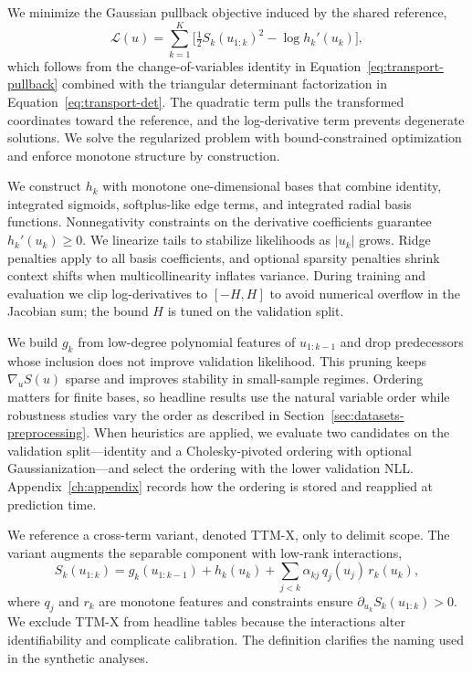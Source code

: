 \documentclass[11pt,a4paper,twoside]{book}\usepackage[]{graphicx}\usepackage[]{xcolor}
\begin{document}
We minimize the Gaussian pullback objective induced by the shared reference,
\begin{equation}
  \mathcal{L}(u) = \sum_{k=1}^K \Big[ \tfrac{1}{2} S_k(u_{1:k})^2 - \log h_k'(u_k) \Big],
  \label{eq:ttm-separable-loss}
\end{equation}
which follows from the change-of-variables identity in Equation~\eqref{eq:transport-pullback} combined with the triangular determinant factorization in Equation~\eqref{eq:transport-det}. The quadratic term pulls the transformed coordinates toward the reference, and the log-derivative term prevents degenerate solutions. We solve the regularized problem with bound-constrained optimization and enforce monotone structure by construction.

We construct $h_k$ with monotone one-dimensional bases that combine identity, integrated sigmoids, softplus-like edge terms, and integrated radial basis functions. Nonnegativity constraints on the derivative coefficients guarantee $h_k'(u_k) \ge 0$. We linearize tails to stabilize likelihoods as $|u_k|$ grows. Ridge penalties apply to all basis coefficients, and optional sparsity penalties shrink context shifts when multicollinearity inflates variance. During training and evaluation we clip log-derivatives to $[-H, H]$ to avoid numerical overflow in the Jacobian sum; the bound $H$ is tuned on the validation split.

We build $g_k$ from low-degree polynomial features of $u_{1:k-1}$ and drop predecessors whose inclusion does not improve validation likelihood. This pruning keeps $\nabla_u S(u)$ sparse and improves stability in small-sample regimes. Ordering matters for finite bases, so headline results use the natural variable order while robustness studies vary the order as described in Section~\ref{sec:datasets-preprocessing}. When heuristics are applied, we evaluate two candidates on the validation split—identity and a Cholesky-pivoted ordering with optional Gaussianization—and select the ordering with the lower validation NLL. Appendix~\ref{ch:appendix} records how the ordering is stored and reapplied at prediction time.

We reference a cross-term variant, denoted TTM-X, only to delimit scope. The variant augments the separable component with low-rank interactions,
\begin{equation}
  S_k(u_{1:k}) = g_k(u_{1:k-1}) + h_k(u_k) + \sum_{j<k} \alpha_{kj}\,q_j(u_j)\,r_k(u_k),
  \label{eq:ttm-cross}
\end{equation}
where $q_j$ and $r_k$ are monotone features and constraints ensure $\partial_{u_k} S_k(u_{1:k}) > 0$. We exclude TTM-X from headline tables because the interactions alter identifiability and complicate calibration. The definition clarifies the naming used in the synthetic analyses.
\end{document}

